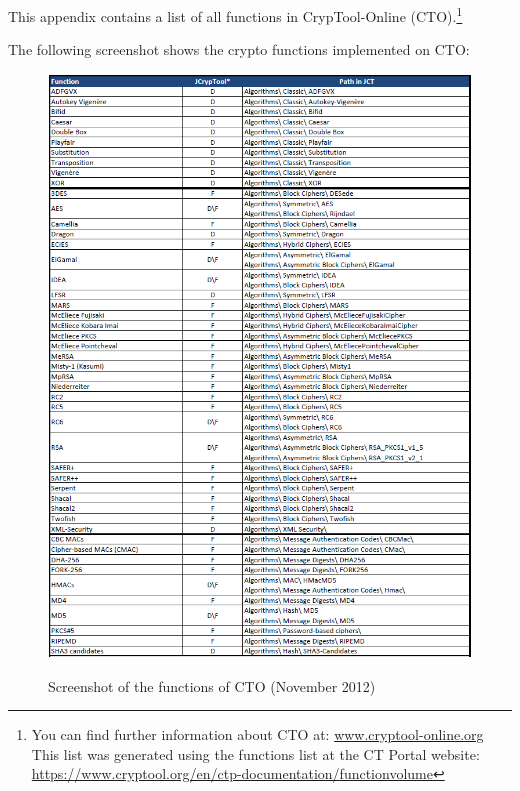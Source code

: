\noindent This appendix contains a list of all
functions in CrypTool-Online (CTO).\footnote{%
  You can find further information about CTO at:
  \url{www.cryptool-online.org} \\
  This list was generated using the functions list at the CT Portal website:\\
  \url{https://www.cryptool.org/en/ctp-documentation/functionvolume}}




\noindent The following screenshot shows the crypto functions implemented on CTO:
\clearpage
\begin{figure}[hb]
\begin{center}
\vspace{-30pt}
\includegraphics[scale=0.8, angle=0] {figures/JCT-functions-en-1}
\hypertarget{functions-overview-1-CTO}{}
\caption{Screenshot of the functions of CTO (November 2012)} 
\label{functions-overview-1-CTO}
\end{center}
\end{figure}
\clearpage

